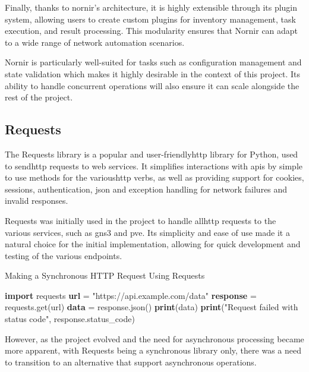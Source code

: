 Finally, thanks to nornir's architecture, it is highly extensible through its plugin system, allowing users to create 
custom plugins for inventory management, task execution, and result processing. This modularity ensures that Nornir can 
adapt to a wide range of network automation scenarios.

Nornir is particularly well-suited for tasks such as configuration management and state validation which makes it 
highly desirable in the context of this project. Its ability to handle concurrent operations will also ensure it can scale 
alongside the rest of the project.

\subsection{Requests}
The Requests\cite{requests2025} library is a popular and user-friendly\ac{http} library for Python, used to send\ac{http} 
requests to web services. It simplifies interactions with \ac{api}s by simple to use methods for the various\ac{http} verbs, 
as well as providing support for cookies, sessions, authentication, \ac{json} and exception handling for network failures and 
invalid responses.

Requests was initially used in the project to handle all\ac{http} requests to the various services, such as
\ac{gns3} and \ac{pve}. Its simplicity and ease of use made it a natural choice for the initial implementation, allowing
for quick development and testing of the various endpoints.

\begin{algorithm}
  \caption{Making a Synchronous HTTP Request Using Requests}\label{requests-basic}
  \begin{algorithmic}[1]
    \State \textbf{import} requests
    \State
    \State \textbf{url} = "https://api.example.com/data"
    \State \textbf{response} = requests.get(url)
    \State
      \State \textbf{data} = response.json()
      \State \textbf{print}(data)
    \Else
      \State \textbf{print}("Request failed with status code", response.status\_code)
    \EndIf
  \end{algorithmic}
\end{algorithm}

However, as the project evolved and the need for asynchronous processing became more apparent, with Requests being a 
synchronous library only, there was a need to transition to an alternative that support asynchronous operations.

